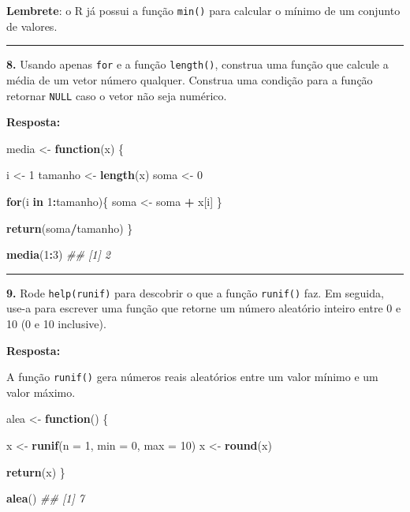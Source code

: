 \documentclass[
]{book}
\newenvironment{Shaded}{\begin{snugshade}}{\end{snugshade}}
\newcommand{\CommentTok}[1]{\textcolor[rgb]{0.56,0.35,0.01}{\textit{#1}}}
\newcommand{\ControlFlowTok}[1]{\textcolor[rgb]{0.13,0.29,0.53}{\textbf{#1}}}
\newcommand{\DataTypeTok}[1]{\textcolor[rgb]{0.13,0.29,0.53}{#1}}
\newcommand{\DecValTok}[1]{\textcolor[rgb]{0.00,0.00,0.81}{#1}}
\newcommand{\KeywordTok}[1]{\textcolor[rgb]{0.13,0.29,0.53}{\textbf{#1}}}
\newcommand{\NormalTok}[1]{#1}
\newcommand{\OperatorTok}[1]{\textcolor[rgb]{0.81,0.36,0.00}{\textbf{#1}}}
\newcommand{\StringTok}[1]{\textcolor[rgb]{0.31,0.60,0.02}{#1}}
\begin{document}
\textbf{Lembrete}: o R já possui a função \texttt{min()} para calcular o mínimo de um conjunto de valores.

\begin{center}\rule{0.5\linewidth}{0.5pt}\end{center}

\textbf{8.} Usando apenas \texttt{for} e a função \texttt{length()}, construa uma função que calcule a média de um vetor número qualquer. Construa uma condição para a função retornar \texttt{NULL} caso o vetor não seja numérico.

\textbf{Resposta:}

\begin{Shaded}
\begin{Highlighting}[]
\NormalTok{media <-}\StringTok{ }\ControlFlowTok{function}\NormalTok{(x) \{}
  
\NormalTok{  i <-}\StringTok{ }\DecValTok{1}
\NormalTok{  tamanho <-}\StringTok{ }\KeywordTok{length}\NormalTok{(x)}
\NormalTok{  soma <-}\StringTok{ }\DecValTok{0}
  
  \ControlFlowTok{for}\NormalTok{(i }\ControlFlowTok{in} \DecValTok{1}\OperatorTok{:}\NormalTok{tamanho)\{}
\NormalTok{    soma <-}\StringTok{ }\NormalTok{soma }\OperatorTok{+}\StringTok{ }\NormalTok{x[i]}
\NormalTok{  \}}
  
  \KeywordTok{return}\NormalTok{(soma}\OperatorTok{/}\NormalTok{tamanho)}
\NormalTok{\}}

\KeywordTok{media}\NormalTok{(}\DecValTok{1}\OperatorTok{:}\DecValTok{3}\NormalTok{)}
\CommentTok{## [1] 2}
\end{Highlighting}
\end{Shaded}

\begin{center}\rule{0.5\linewidth}{0.5pt}\end{center}

\textbf{9.} Rode \texttt{help(runif)} para descobrir o que a função \texttt{runif()} faz. Em seguida, use-a para escrever uma função que retorne um número aleatório inteiro entre 0 e 10 (0 e 10 inclusive).

\textbf{Resposta:}

A função \texttt{runif()} gera números reais aleatórios entre um valor mínimo e um valor máximo.

\begin{Shaded}
\begin{Highlighting}[]
\NormalTok{alea <-}\StringTok{ }\ControlFlowTok{function}\NormalTok{() \{}
  
\NormalTok{  x <-}\StringTok{ }\KeywordTok{runif}\NormalTok{(}\DataTypeTok{n =} \DecValTok{1}\NormalTok{, }\DataTypeTok{min =} \DecValTok{0}\NormalTok{, }\DataTypeTok{max =} \DecValTok{10}\NormalTok{)}
\NormalTok{  x <-}\StringTok{ }\KeywordTok{round}\NormalTok{(x)}
  
  \KeywordTok{return}\NormalTok{(x)}
\NormalTok{\}}

\KeywordTok{alea}\NormalTok{()}
\CommentTok{## [1] 7}
\end{Highlighting}
\end{Shaded}
\end{document}
